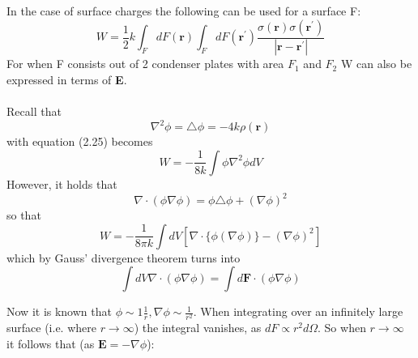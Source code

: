 In the case of surface charges the following can be used for a surface F:
\begin{equation}
    W=\frac{1}{2} k \int_{F} d F(\mathbf{r}) \int_{F} d F\left(\mathbf{r}^{\prime}\right) \frac{\sigma(\mathbf{r}) \sigma\left(\mathbf{r}^{\prime}\right)}{\left|\mathbf{r}-\mathbf{r}^{\prime}\right|}
\end{equation}
For when F consists out of 2 condenser plates with area $F_1$ and $F_2$ W can also be expressed in terms of \textbf{E}.\\
\\
\noindent Recall that
\begin{equation}
     \nabla^2 \phi = \triangle\phi = -4k\rho(\textbf{r})
\end{equation}
with equation (2.25) becomes
\begin{equation}
    W = - \frac{1}{8k} \int \phi \nabla^2 \phi dV
\end{equation}
However, it holds that
\begin{equation}
    \nabla \cdot (\phi \nabla \phi) = \phi \triangle \phi + (\nabla\phi)^2
\end{equation}
so that
\begin{equation}
    W=-\frac{1}{8 \pi k} \int d V\left[\nabla \cdot\{\phi(\nabla \phi)\}-(\nabla \phi)^{2}\right]
\end{equation}
which by Gauss' divergence theorem turns into 
\begin{equation}
    \int dV \nabla \cdot (\phi \nabla \phi) = \int d\textbf{F} \cdot (\phi \nabla \phi)
\end{equation}

\noindent Now it is known that $\phi \sim 1\frac{1}{r},\nabla\phi \sim \frac{1}{r^2}$. When integrating over an infinitely large surface (i.e. where $r \rightarrow \infty$)
the integral vanishes, as $dF \propto r^2 d\Omega$. So when $r \rightarrow \infty$ it follows that (as $\textbf{E} = -\nabla \phi$):

